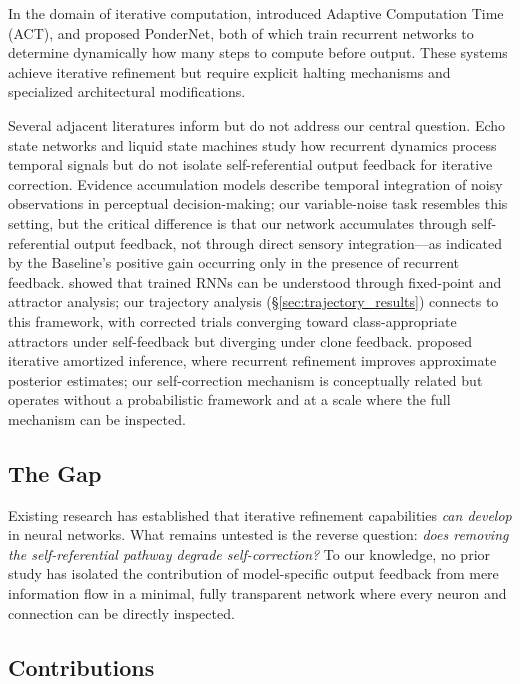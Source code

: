 \documentclass[10pt]{article}
\begin{document}
In the domain of iterative computation, \citet{graves2016adaptive} introduced Adaptive Computation Time (ACT), and \citet{banino2021pondernet} proposed PonderNet, both of which train recurrent networks to determine dynamically how many steps to compute before output. These systems achieve iterative refinement but require explicit halting mechanisms and specialized architectural modifications.

Several adjacent literatures inform but do not address our central question. Echo state networks \citep{jaeger2001echo} and liquid state machines \citep{maass2002realtime} study how recurrent dynamics process temporal signals but do not isolate self-referential output feedback for iterative correction. Evidence accumulation models \citep{gold2007neural} describe temporal integration of noisy observations in perceptual decision-making; our variable-noise task resembles this setting, but the critical difference is that our network accumulates through self-referential output feedback, not through direct sensory integration---as indicated by the Baseline's positive gain occurring only in the presence of recurrent feedback. \citet{sussillo2013opening} showed that trained RNNs can be understood through fixed-point and attractor analysis; our trajectory analysis (\S\ref{sec:trajectory_results}) connects to this framework, with corrected trials converging toward class-appropriate attractors under self-feedback but diverging under clone feedback. \citet{marino2018iterative} proposed iterative amortized inference, where recurrent refinement improves approximate posterior estimates; our self-correction mechanism is conceptually related but operates without a probabilistic framework and at a scale where the full mechanism can be inspected.

\subsection{The Gap}

Existing research has established that iterative refinement capabilities \emph{can develop} in neural networks. What remains untested is the reverse question: \emph{does removing the self-referential pathway degrade self-correction?} To our knowledge, no prior study has isolated the contribution of model-specific output feedback from mere information flow in a minimal, fully transparent network where every neuron and connection can be directly inspected.

\subsection{Contributions}
\end{document}
